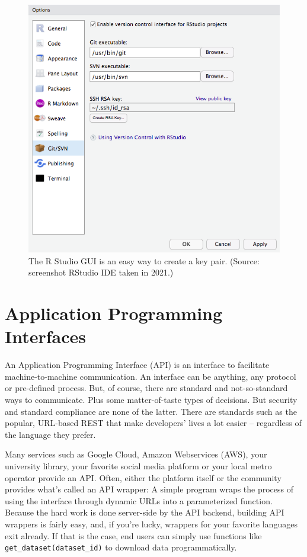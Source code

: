 \documentclass[
  12pt,
  letterpaper,
]{krantz}
\begin{document}
\begin{figure}

{\centering \includegraphics{./images/rsa.png}

}

\caption{The R Studio GUI is an easy way to create a key pair. (Source:
screenshot RStudio IDE taken in 2021.)}

\end{figure}

\hypertarget{application-programming-interfaces}{%
\section{Application Programming
Interfaces}\label{application-programming-interfaces}}

An Application Programming Interface (API) is an interface to
facilitate machine-to-machine communication. An interface can be
anything, any protocol or pre-defined process. But, of course, there are
standard and not-so-standard ways to communicate. Plus some
matter-of-taste types of decisions. But security and standard compliance
are none of the latter. There are standards such as the popular,
URL-based REST that make developers' lives a lot easier --
regardless of the language they prefer.

Many services such as Google Cloud, Amazon Webservices (AWS), your
university library, your favorite social media platform or your local
metro operator provide an API. Often, either the platform itself or the
community provides what's called an API wrapper: A simple program wraps
the process of using the interface through dynamic URLs into a
parameterized function. Because the hard work is done server-side by the
API backend, building API wrappers is fairly easy, and, if you're lucky,
wrappers for your favorite languages exit already. If that is the case,
end users can simply use functions like
\texttt{get\_dataset(dataset\_id)} to download data programmatically.
\end{document}

